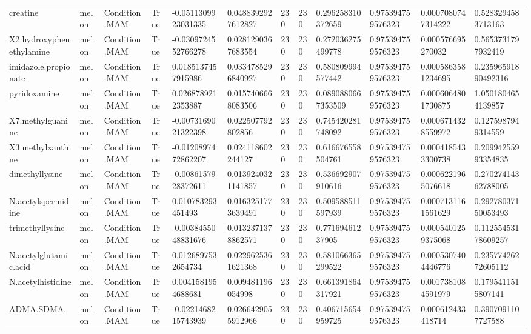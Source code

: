 \begin{longtable}{llllllllllll}
creatine & melon & Condition.MAM & True & -0.0511309923031335 & 0.0488392927612827 & 230 & 230 & 0.296258310372659 & 0.975394759576323 & 0.0007080747314222 & 0.5283294583713163 \\
X2.hydroxyphenethylamine & melon & Condition.MAM & True & -0.0309724552766278 & 0.0281290367683554 & 230 & 230 & 0.272036275499778 & 0.975394759576323 & 0.000576695270032 & 0.5653731797932419 \\
imidazole.propionate & melon & Condition.MAM & True & 0.0185137457915986 & 0.0334785296840927 & 230 & 230 & 0.580809994577442 & 0.975394759576323 & 0.0005863581234695 & 0.23596591890492316 \\
pyridoxamine & melon & Condition.MAM & True & 0.0268789212353887 & 0.0157406668083506 & 230 & 230 & 0.0890880667353509 & 0.975394759576323 & 0.0006064801730875 & 1.0501804654139857 \\
X7.methylguanine & melon & Condition.MAM & True & -0.0073169021322398 & 0.022507792802856 & 230 & 230 & 0.745420281748092 & 0.975394759576323 & 0.0006714328559972 & 0.1275987949314559 \\
X3.methylxanthine & melon & Condition.MAM & True & -0.0120897472862207 & 0.024118602244127 & 230 & 230 & 0.616676558504761 & 0.975394759576323 & 0.0004185433300738 & 0.20994255993354835 \\
dimethyllysine & melon & Condition.MAM & True & -0.0086157928372611 & 0.0139240321141857 & 230 & 230 & 0.536692907910616 & 0.975394759576323 & 0.0006221965076618 & 0.27027414362788005 \\
N.acetylspermidine & melon & Condition.MAM & True & 0.010783293451493 & 0.0163251773639491 & 230 & 230 & 0.509588511597939 & 0.975394759576323 & 0.0007131161561629 & 0.29278037150053493 \\
trimethyllysine & melon & Condition.MAM & True & -0.0038455048831676 & 0.0132371378862571 & 230 & 230 & 0.77169461237905 & 0.975394759576323 & 0.0005401259375068 & 0.11255453178609257 \\
N.acetylglutamic.acid & melon & Condition.MAM & True & 0.0126897532654734 & 0.0229625361621368 & 230 & 230 & 0.581066365299522 & 0.975394759576323 & 0.0005307404446776 & 0.23577426272605112 \\
N.acetylhistidine & melon & Condition.MAM & True & 0.0041581954688681 & 0.009481196054998 & 230 & 230 & 0.661391864317921 & 0.975394759576323 & 0.0017381084591979 & 0.1795411515807141 \\
ADMA.SDMA. & melon & Condition.MAM & True & -0.0221468215743939 & 0.0266429055912966 & 230 & 230 & 0.406715654959725 & 0.975394759576323 & 0.000612433418714 & 0.3907091107727588 \\

\end{longtable}
